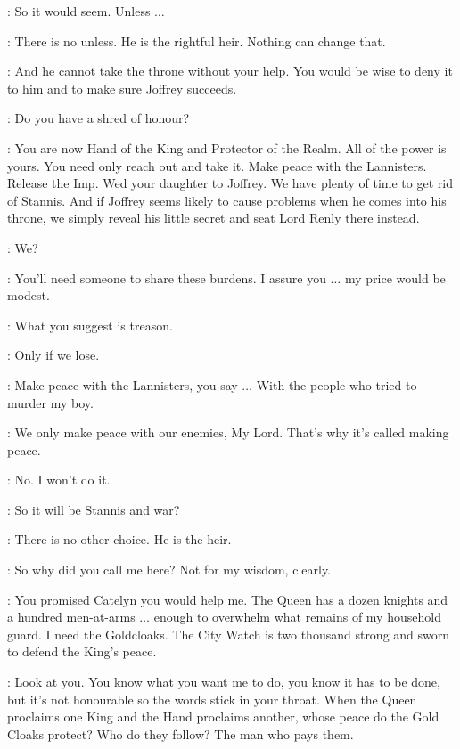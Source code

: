 \LITTLEFINGER: So it would seem. Unless $\ldots$ 

\NED: There is no unless. He is the rightful heir. Nothing can change that. 

\LITTLEFINGER: And he cannot take the throne without your help. You would be wise to deny it to him and to make sure Joffrey succeeds. 

\NED: Do you have a shred of honour? 

\LITTLEFINGER: You are now Hand of the King and Protector of the Realm. All of the power is yours. You need only reach out and take it. Make peace with the Lannisters. Release the Imp. Wed your daughter to Joffrey. We have plenty of time to get rid of Stannis. And if Joffrey seems likely to cause problems when he comes into his throne, we simply reveal his little secret and seat Lord Renly there instead. 

\NED: We? 

\LITTLEFINGER: You'll need someone to share these burdens. I assure you $\ldots$ my price would be modest. 

\NED: What you suggest is treason. 

\LITTLEFINGER: Only if we lose. 

\NED: Make peace with the Lannisters, you say $\ldots$ With the people who tried to murder my boy. 

\LITTLEFINGER: We only make peace with our enemies, My Lord. That's why it's called making peace. 

\NED: No. I won't do it. 

\LITTLEFINGER: So it will be Stannis and war? 

\NED: There is no other choice. He is the heir. 

\LITTLEFINGER: So why did you call me here? Not for my wisdom, clearly. 

\NED: You promised Catelyn you would help me. The Queen has a dozen knights and a hundred men-at-arms $\ldots$ enough to overwhelm what remains of my household guard. I need the Goldcloaks. The City Watch is two thousand strong and sworn to defend the King's peace. 

\LITTLEFINGER: Look at you. You know what you want me to do, you know it has to be done, but it's not honourable so the words stick in your throat. When the Queen proclaims one King and the Hand proclaims another, whose peace do the Gold Cloaks protect? Who do they follow? The man who pays them. 


\scene

